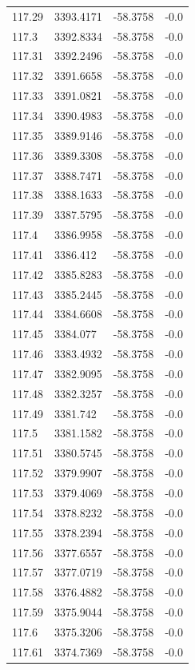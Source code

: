 \begin{table}[H]
\begin{tabular}{llll}
117.29 & 3393.4171 & -58.3758 & -0.0 \\
117.3 & 3392.8334 & -58.3758 & -0.0 \\
117.31 & 3392.2496 & -58.3758 & -0.0 \\
117.32 & 3391.6658 & -58.3758 & -0.0 \\
117.33 & 3391.0821 & -58.3758 & -0.0 \\
117.34 & 3390.4983 & -58.3758 & -0.0 \\
117.35 & 3389.9146 & -58.3758 & -0.0 \\
117.36 & 3389.3308 & -58.3758 & -0.0 \\
117.37 & 3388.7471 & -58.3758 & -0.0 \\
117.38 & 3388.1633 & -58.3758 & -0.0 \\
117.39 & 3387.5795 & -58.3758 & -0.0 \\
117.4 & 3386.9958 & -58.3758 & -0.0 \\
117.41 & 3386.412 & -58.3758 & -0.0 \\
117.42 & 3385.8283 & -58.3758 & -0.0 \\
117.43 & 3385.2445 & -58.3758 & -0.0 \\
117.44 & 3384.6608 & -58.3758 & -0.0 \\
117.45 & 3384.077 & -58.3758 & -0.0 \\
117.46 & 3383.4932 & -58.3758 & -0.0 \\
117.47 & 3382.9095 & -58.3758 & -0.0 \\
117.48 & 3382.3257 & -58.3758 & -0.0 \\
117.49 & 3381.742 & -58.3758 & -0.0 \\
117.5 & 3381.1582 & -58.3758 & -0.0 \\
117.51 & 3380.5745 & -58.3758 & -0.0 \\
117.52 & 3379.9907 & -58.3758 & -0.0 \\
117.53 & 3379.4069 & -58.3758 & -0.0 \\
117.54 & 3378.8232 & -58.3758 & -0.0 \\
117.55 & 3378.2394 & -58.3758 & -0.0 \\
117.56 & 3377.6557 & -58.3758 & -0.0 \\
117.57 & 3377.0719 & -58.3758 & -0.0 \\
117.58 & 3376.4882 & -58.3758 & -0.0 \\
117.59 & 3375.9044 & -58.3758 & -0.0 \\
117.6 & 3375.3206 & -58.3758 & -0.0 \\
117.61 & 3374.7369 & -58.3758 & -0.0 \\

\end{tabular}
\end{table}
